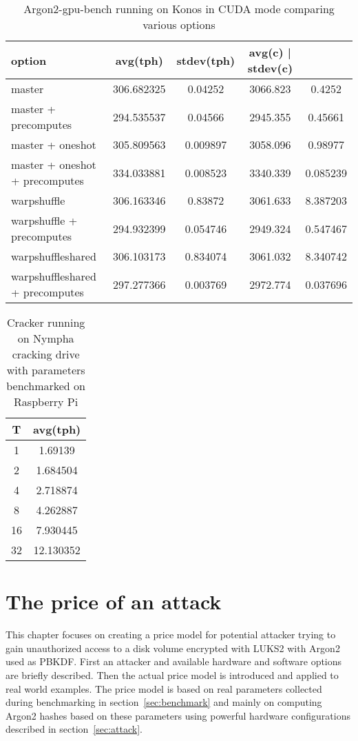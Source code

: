 \documentclass[nolof]{fithesis3}
\begin{document}
\noindent
\begin{table}
\caption{Argon2-gpu-bench running on Konos in CUDA mode comparing various options}
\label{tab:konosgpuopt}
\begin{tabularx}{\textwidth}{| l | c | c | c | c |}
\hline
option & avg(tph) & stdev(tph) & avg(c) | stdev(c)\\
\hline
master & 306.682325 & 0.04252 & 3066.823 & 0.4252 \\
\hline
master + precomputes & 294.535537 & 0.04566 & 2945.355 & 0.45661 \\
\hline
master + oneshot & 305.809563 & 0.009897 & 3058.096 & 0.98977 \\
\hline
master + oneshot + precomputes & 334.033881 & 0.008523 & 3340.339 & 0.085239 \\
\hline
warpshuffle & 306.163346 & 0.83872 & 3061.633 & 8.387203 \\
\hline
warpshuffle + precomputes & 294.932399 & 0.054746 & 2949.324 & 0.547467\\
\hline
warpshuffleshared & 306.103173 & 0.834074 & 3061.032 & 8.340742 \\
\hline
warpshuffleshared + precomputes & 297.277366 & 0.003769 & 2972.774 & 0.037696 \\
\hline
\end{tabularx}
\end{table}

\noindent
\begin{table}
\caption{Cracker running on Nympha cracking drive with parameters benchmarked on Raspberry Pi}
\label{tab:nymphacrackerrpi}
\begin{tabularx}{\textwidth}{| c | c |}
\hline
T & avg(tph)\\
\hline
1 & 1.69139\\
\hline
2 & 1.684504\\
\hline
4 & 2.718874\\
\hline
8 & 4.262887\\
\hline
16 & 7.930445\\
\hline
32 & 12.130352\\
\hline
\end{tabularx}
\end{table}




\chapter{The price of an attack}
\label{chap:model}
This chapter focuses on creating a price model for potential attacker trying to gain unauthorized access to a disk volume encrypted with LUKS2 with Argon2 used as PBKDF. First an attacker and available hardware and software options are briefly described. Then the actual price model is introduced and applied to real world examples. The price model is based on real parameters collected during benchmarking in section~\ref{sec:benchmark} and mainly on computing Argon2 hashes based on these parameters using powerful hardware configurations described in section~\ref{sec:attack}.
\end{document}
